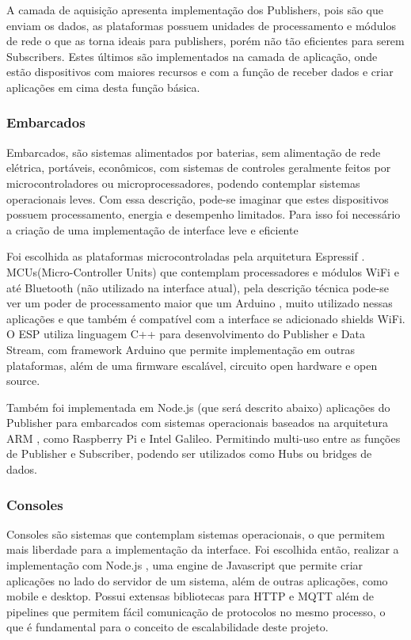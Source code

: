 A camada de aquisição apresenta implementação dos Publishers, pois são que enviam os dados, as plataformas possuem unidades de processamento e módulos de rede o que as torna ideais para publishers, porém não tão eficientes para serem Subscribers. Estes últimos são implementados na camada de aplicação, onde estão dispositivos com maiores recursos e com a função de receber dados e criar aplicações em cima desta função básica.

\subsubsection{Embarcados}
\label{subsubsection:embarcados}

Embarcados, são sistemas alimentados por baterias, sem alimentação de rede elétrica, portáveis, econômicos, com sistemas de controles geralmente feitos por microcontroladores ou microprocessadores, podendo contemplar sistemas operacionais leves. Com essa descrição, pode-se imaginar que estes dispositivos possuem processamento, energia e desempenho limitados. Para isso foi necessário a criação de uma implementação de interface leve e eficiente

Foi escolhida as plataformas microcontroladas pela arquitetura Espressif \cite{espressif}. MCUs(Micro-Controller Units) que contemplam processadores e módulos WiFi e até Bluetooth (não utilizado na interface atual), pela descrição técnica pode-se ver um poder de processamento maior que um Arduino \cite{arduino}, muito utilizado nessas aplicações e que também é compatível com a interface se adicionado shields WiFi. O ESP utiliza linguagem C++ \cite{c++} para desenvolvimento do Publisher e Data Stream, com framework Arduino que permite implementação em outras plataformas, além de uma firmware escalável, circuito open hardware e open source.

Também foi implementada em Node.js (que será descrito abaixo) aplicações do Publisher para embarcados com sistemas operacionais baseados na arquitetura ARM \cite{arm}, como Raspberry Pi \cite{raspberry-pi} e Intel Galileo. Permitindo multi-uso entre as funções de Publisher e Subscriber, podendo ser utilizados como Hubs ou bridges de dados.

\subsubsection{Consoles}
\label{subsubsection:consoles}

Consoles são sistemas que contemplam sistemas operacionais, o que permitem mais liberdade para a implementação da interface. Foi escolhida então, realizar a implementação com Node.js \cite{nodejs}, uma engine de Javascript que permite criar aplicações no lado do servidor de um sistema, além de outras aplicações, como mobile e desktop. Possui extensas bibliotecas para HTTP e MQTT além de pipelines que permitem fácil comunicação de protocolos no mesmo processo, o que é fundamental para o conceito de escalabilidade deste projeto.

